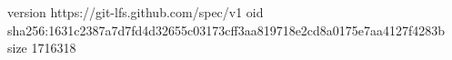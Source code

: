 version https://git-lfs.github.com/spec/v1
oid sha256:1631c2387a7d7fd4d32655c03173cff3aa819718e2cd8a0175e7aa4127f4283b
size 1716318
